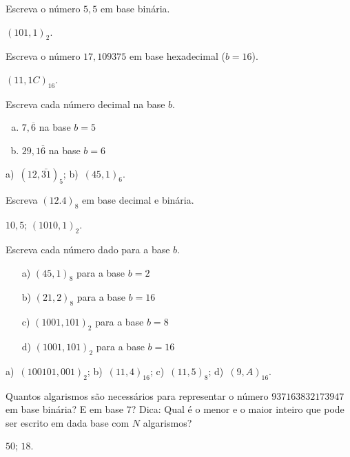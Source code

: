 \begin{exer}
  Escreva o número $5,5$ em base binária.
\end{exer}
\begin{resp}
    $(101,1)_2$.
\end{resp}

\begin{exer}
  Escreva o número $17,109375$ em base hexadecimal ($b=16$).
\end{exer}
\begin{resp} $(11,1C)_{16}$.
\end{resp}

\begin{exer} Escreva cada número decimal na base $b$.
  \begin{enumerate}[a)]
  \item $7,\overline{6}$ na base $b=5$
  \item $29,1\overline{6}$ na base $b=6$
  \end{enumerate}
\end{exer}
\begin{resp}
  a)~$(12,\bar{31})_5$; b)~$(45,1)_6$.
\end{resp}

\begin{exer}
  Escreva $(12.4)_8$ em base decimal e binária.
\end{exer}
\begin{resp}
    $10,5$; $(1010,1)_2$.
\end{resp}

\begin{exer} Escreva cada número dado para a base $b$.
  \begin{enumerate}[a)]
  \item[a)] $(45,1)_8$ para a base $b=2$
  \item[b)] $(21,2)_8$ para a base $b=16$
  \item[c)] $(1001,101)_2$ para a base $b=8$
  \item[d)] $(1001,101)_2$ para a base $b=16$
  \end{enumerate}
\end{exer}
\begin{resp}
  a)~$(100101,001)_2$; b)~$(11,4)_{16}$; c)~$(11,5)_8$; d)~$(9,A)_{16}$.
\end{resp}

\begin{exer} Quantos algarismos são necessários para representar o número $937163832173947$ em base binária? E em base 7? Dica: Qual é o menor e o maior inteiro que pode ser escrito em dada base com $N$ algarismos?
\end{exer}
\begin{resp}
  $50$; $18$.
\end{resp}

